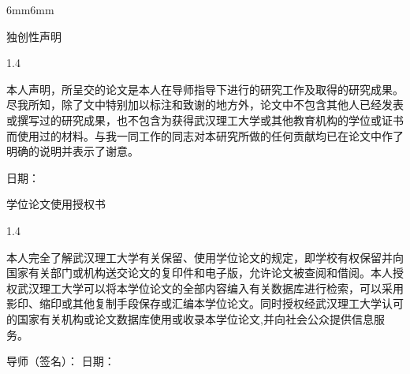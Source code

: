 \begin{titlepage}

\begin{adjustwidth}{6mm}{6mm}

\makebox[30mm]{\vspace{20mm}}

\begin{center}
\heiti 独创性声明
\end{center}
\vspace{5mm}
\begin{spacing}{1.4}
\par {\STZhongsong  本人声明，所呈交的论文是本人在导师指导下进行的研究工作及取得的研究成果。尽我所知，除了文中特别加以标注和致谢的地方外，论文中不包含其他人已经发表或撰写过的研究成果，也不包含为获得武汉理工大学或其他教育机构的学位或证书而使用过的材料。与我一同工作的同志对本研究所做的任何贡献均已在论文中作了明确的说明并表示了谢意。}
\end{spacing}
\vspace{3mm}
 \underline{\makebox[30mm]{}} \hspace{8mm} {\STZhongsong 日\hspace{3mm}期：} \underline{\makebox[30mm]{}}


\vspace{40mm}




\begin{center}
\heiti 学位论文使用授权书
\end{center}
\vspace{3mm}
\begin{spacing}{1.4}
\par {\STZhongsong 本人完全了解武汉理工大学有关保留、使用学位论文的规定，即学校有权保留并向国家有关部门或机构送交论文的复印件和电子版，允许论文被查阅和借阅。本人授权武汉理工大学可以将本学位论文的全部内容编入有关数据库进行检索，可以采用影印、缩印或其他复制手段保存或汇编本学位论文。同时授权经武汉理工大学认可的国家有关机构或论文数据库使用或收录本学位论文,并向社会公众提供信息服务。}
\end{spacing}
\vspace{3mm}

\vspace{20mm}
 \hspace{20mm} {\STZhongsong 导师（签名）：} \hspace{20mm} {\STZhongsong 日期：}


\end{adjustwidth}
\end{titlepage}



